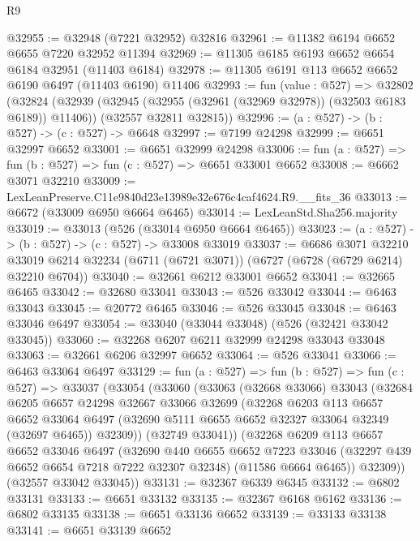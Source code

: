 \begin{lexlean}{R9}
\begin{coremodule}
@32955 := @32948 (@7221 @32952) @32816
@32961 := @11382 @6194 @6652 @6655 @7220 @32952 @11394
@32969 := @11305 @6185 @6193 @6652 @6654 @6184 @32951 (@11403 @6184)
@32978 := @11305 @6191 @113 @6652 @6652 @6190 @6497 (@11403 @6190) @11406
@32993 := fun (value : @527) =>
  @32802
    (@32824
      (@32939 (@32945 (@32955 (@32961 (@32969 @32978)) (@32503 @6183 @6189)) @11406))
      (@32557 @32811 @32815))
@32996 := (a : @527) -> (b : @527) -> (c : @527) -> @6648
@32997 := @7199 @24298
@32999 := @6651 @32997 @6652
@33001 := @6651 @32999 @24298
@33006 := fun (a : @527) => fun (b : @527) => fun (c : @527) => @6651 @33001 @6652
@33008 := @6662 @3071 @32210
@33009 := LexLeanPreserve.C11e9840d23e13989e32e676c4caf4624.R9.__fits_36
@33013 := @6672 (@33009 @6950 @6664 @6465)
@33014 := LexLeanStd.Sha256.majority
@33019 := @33013 (@526 (@33014 @6950 @6664 @6465))
@33023 := (a : @527) -> (b : @527) -> (c : @527) -> @33008 @33019
@33037 := @6686
    @3071
    @32210
    @33019
    @6214
    @32234
    (@6711 (@6721 @3071))
    (@6727 (@6728 (@6729 @6214) @32210 @6704))
@33040 := @32661 @6212 @33001 @6652
@33041 := @32665 @6465
@33042 := @32680 @33041
@33043 := @526 @33042
@33044 := @6463 @33043
@33045 := @20772 @6465
@33046 := @526 @33045
@33048 := @6463 @33046 @6497
@33054 := @33040 (@33044 @33048) (@526 (@32421 @33042 @33045))
@33060 := @32268 @6207 @6211 @32999 @24298 @33043 @33048
@33063 := @32661 @6206 @32997 @6652
@33064 := @526 @33041
@33066 := @6463 @33064 @6497
@33129 := fun (a : @527) =>
  fun (b : @527) =>
  fun (c : @527) =>
  @33037
    (@33054
      (@33060
        (@33063
          (@32668 @33066)
          @33043
          (@32684
            @6205
            @6657
            @24298
            @32667
            @33066
            @32699
            (@32268
              @6203
              @113
              @6657
              @6652
              @33064
              @6497
              (@32690 @5111 @6655 @6652 @32327 @33064 @32349 (@32697 @6465))
              @32309))
          (@32749 @33041))
        (@32268
          @6209
          @113
          @6657
          @6652
          @33046
          @6497
          (@32690
            @440
            @6655
            @6652
            @7223
            @33046
            (@32297 @439 @6652 @6654 @7218 @7222 @32307 @32348)
            (@11586 @6664 @6465))
          @32309))
      (@32557 @33042 @33045))
@33131 := @32367 @6339 @6345
@33132 := @6802 @33131
@33133 := @6651 @33132
@33135 := @32367 @6168 @6162
@33136 := @6802 @33135
@33138 := @6651 @33136 @6652
@33139 := @33133 @33138
@33141 := @6651 @33139 @6652

\end{coremodule}
\end{lexlean}
